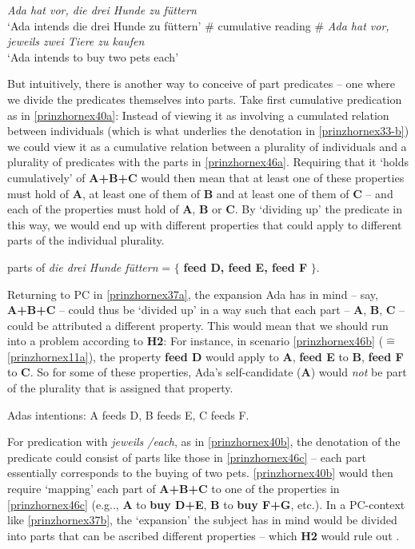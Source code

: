 \documentclass[output=paper,colorlinks,citecolor=brown,
]{langscibook}
\begin{document}
\ea  \label{prinzhornpc}
\ea  \textit{Ada hat vor, die drei Hunde zu f\"{u}ttern}\\
	`Ada intends die drei Hunde zu f\"{u}ttern' \phantom{.}\hfill $\#$ cumulative reading\label{prinzhornex37a}
	\ex $\#$ \textit{Ada hat vor, jeweils zwei Tiere zu kaufen}\\
	`Ada intends to buy two pets each' \label{prinzhornex37b}
	\z\z

But intuitively, there is another way  to conceive of part predicates -- one where we divide the predicates themselves into parts. Take first cumulative predication as in \ref{prinzhornex40a}: Instead of viewing it as involving a cumulated relation between individuals (which is what underlies the denotation in \ref{prinzhornex33-b}) we could view it as a cumulative relation between a plurality of individuals and a plurality of predicates with the parts in  \ref{prinzhornex46a}. Requiring that it `holds cumulatively' of \textbf{A+B+C} would then mean that at least one of these properties must hold of \textbf{A}, at least one of them  of \textbf{B} and at least one of them of \textbf{C} -- and each of the properties must hold of \textbf{A}, \textbf{B} or \textbf{C}. By `dividing up' the predicate in this way, we would  end up with different properties that could apply to different parts of the individual plurality.

\ea  parts of \textit{die drei Hunde f\"{u}ttern} = $\{$ \textbf{feed D, feed E, feed F} $\}$.\label{prinzhornex46a}
\z

Returning to PC in \ref{prinzhornex37a}, the expansion Ada has in mind -- say, {\bf A+B+C} -- could thus be `divided up' in a way such that each part -- {\bf A}, {\bf B}, {\bf C} -- could be attributed a different property. This would mean that we should run into a problem according to {\bf H2}: For instance, in scenario \ref{prinzhornex46b} ($\widehat{=}$ \ref{prinzhornex11a}), the property {\bf feed D} would apply to \textbf{A},  {\bf feed E} to \textbf{B}, \textbf{feed F} to \textbf{C}. So for some of these properties, Ada's self-candidate (\textbf{A}) would \textit{not}  be part of the plurality that is assigned that property.

 Adas intentions: A feeds D, B feeds E, C feeds F. \label{prinzhornex46b} \z

For predication with \textit{jeweils /each}, as in \ref{prinzhornex40b}, the denotation of  the predicate could consist of parts like those in \ref{prinzhornex46c} -- each part essentially corresponds to the buying of two pets. \ref{prinzhornex40b} would then require `mapping' each part of \textbf{A+B+C} to one of the properties in \ref{prinzhornex46c} (e.g.., \textbf{A} to \textbf{buy D+E}, \textbf{B} to \textbf{buy F+G}, etc.). In a PC-context like \ref{prinzhornex37b},  the `expansion' the subject has in mind would be divided into parts that can be ascribed different properties -- which {\bf H2} would rule out .
\end{document}
